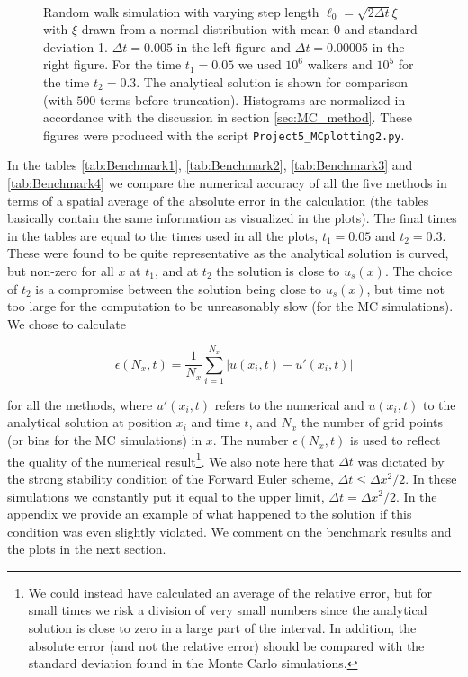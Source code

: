 \documentclass[a4paper, 11pt, notitlepage,english]{article}
\begin{document}
\begin{figure}[h!tb]
 \centering
 \mbox{\quad
 }
 \caption{Random walk simulation with varying step length $\ell_0 = \sqrt{2\Delta t}\xi$ with $\xi$ drawn from a normal distribution with mean 0 and standard deviation 1. $\Delta t = 0.005$ in the left figure and $\Delta t = 0.00005$ in the right figure. For the time $t_1 = 0.05$ we used $10^6$ walkers and $10^5$ for the time $t_2 = 0.3$. The analytical solution is shown for comparison (with $500$ terms before truncation). Histograms are normalized in accordance with the discussion in section \ref{sec:MC_method}. These figures were produced with the script \texttt{Project5\_MCplotting2.py}.}
\label{fig:MC_gaussian}
\end{figure}

In the tables \ref{tab:Benchmark1}, \ref{tab:Benchmark2}, \ref{tab:Benchmark3} and \ref{tab:Benchmark4} we compare the numerical accuracy of all the five methods in terms of a spatial average of the absolute error in the calculation (the tables basically contain the same information as visualized in the plots). The final times in the tables are equal to the times used in all the plots, $t_1 = 0.05$ and $t_2 = 0.3$. These were found to be quite representative as the analytical solution is curved, but non-zero for all $x$ at $t_1$, and at $t_2$ the solution is close to $u_s(x)$. The choice of $t_2$ is a compromise between the solution being close to $u_s(x)$, but time not too large for the computation to be unreasonably slow (for the MC simulations). We chose to calculate

\begin{equation}
\epsilon(N_x,t) = \frac{1}{N_x}\sum_{i=1}^{N_x} \lvert u(x_i,t) - u'(x_i,t) \rvert
\label{eq:Mean_absolute_error}
\end{equation}

for all the methods, where $u'(x_i,t)$ refers to the numerical and $u(x_i,t)$ to the analytical solution at position $x_i$ and time $t$, and $N_x$ the number of grid points (or bins for the MC simulations) in $x$. The number $\epsilon(N_x,t)$ is used to reflect the quality of the numerical result\footnote{We could instead have calculated an average of the relative error, but for small times we risk a division of very small numbers since the analytical solution is close to zero in a large part of the interval. In addition, the absolute error (and not the relative error) should be compared with the standard deviation found in the Monte Carlo simulations.}. We also note here that $\Delta t$ was dictated by the strong stability condition of the Forward Euler scheme, $\Delta t \leq \Delta x^2 /2$. In these simulations we constantly put it equal to the upper limit, $\Delta t = \Delta x^2 /2$. In the appendix we provide an example of what happened to the solution if this condition was even slightly violated. We comment on the benchmark results and the plots in the next section.
\end{document}
